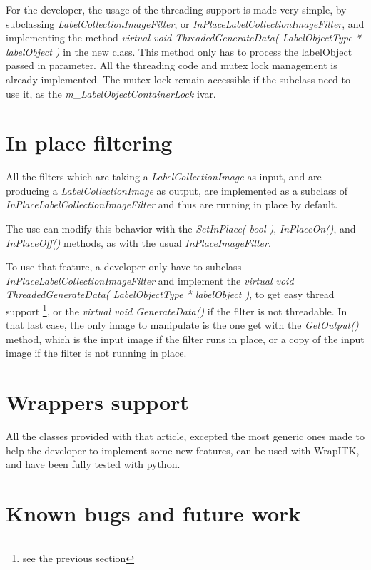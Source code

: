 \documentclass{InsightArticle}
\begin{document}
For the developer, the usage of the threading support is made very simple, by subclassing
{\em LabelCollectionImageFilter}, or {\em InPlaceLabelCollectionImageFilter}, and implementing
the method {\em virtual void ThreadedGenerateData( LabelObjectType * labelObject )} in the
new class. This method only has to process the labelObject passed in parameter. All the
threading code and mutex lock management is already implemented. The mutex lock remain
accessible if the subclass need to use it, as the {\em m\_LabelObjectContainerLock} ivar.

\section{In place filtering}

All the filters which are taking a {\em LabelCollectionImage} as input, and are producing a {\em LabelCollectionImage} as output, are implemented as a subclass of {\em InPlaceLabelCollectionImageFilter} and
thus are running in place by default.

The use can modify this behavior with the {\em SetInPlace( bool )}, {\em InPlaceOn()}, and {\em InPlaceOff()} methods, as with the usual {\em InPlaceImageFilter}.

To use that feature, a developer only have to subclass {\em InPlaceLabelCollectionImageFilter} and
implement the {\em virtual void ThreadedGenerateData( LabelObjectType * labelObject )}, to get easy thread
support \footnote{see the previous section}, or the {\em virtual void GenerateData()} if the filter is not threadable. In that last case,
the only image to manipulate is the one get with the {\em GetOutput()} method, which is the input image if the filter runs in place, or a copy of the input image if the filter is not running in place.


\section{Wrappers support}

All the classes provided with that article, excepted the most generic ones made
to help the developer to implement some new features, can be used with WrapITK,
and have been fully tested with python.

% 

\section{Known bugs and future work}
\end{document}
